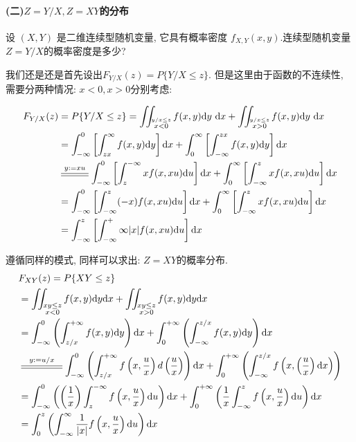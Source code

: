 \paragraph{(二)$Z=Y/X,Z=XY$的分布}

设 $(X, Y)$ 是二维连续型随机变量, 它具有概率密度 $f_{X,Y}(x, y)$.连续型随机变量$Z=Y/X$的概率密度是多少?

我们还是还是首先设出$F_{Y/X}(z)=P\{Y/X\leq z\}$. 但是这里由于函数的不连续性, 需要分两种情况: $x<0, x>0$分别考虑:

$$
\begin{aligned}
F_{Y / X}(z) & =P\{Y / X \leq z\}=\iint_{\stackrel{y / x \leq z}{x<0}} f(x, y) \mathrm{d} y \mathrm{~d} x+\iint_{\stackrel{y / x \leq z}{x>0}} f(x, y) \mathrm{d} y \mathrm{~d} x \\
& =\int_{-\infty}^0\left[\int_{z x}^{\infty} f(x, y) \mathrm{d} y\right] \mathrm{d} x+\int_0^{\infty}\left[\int_{-\infty}^{z x} f(x, y) \mathrm{d} y\right] \mathrm{d} x \\
& \varsub{y:=xu}{1cm} \int_{-\infty}^0\left[\int_z^{-\infty} x f(x, x u) \mathrm{d} u\right] \mathrm{d} x+\int_0^{\infty}\left[\int_{-\infty}^z x f(x, x u) \mathrm{d} u\right] \mathrm{d} x \\
& =\int_{-\infty}^0\left[\int_{-\infty}^z(-x) f(x, x u) \mathrm{d} u\right] \mathrm{d} x+\int_0^{\infty}\left[\int_{-\infty}^z x f(x, x u) \mathrm{d} u\right] \mathrm{d} x \\
& =\int_{-\infty}^z\left[\int_{-\infty}^+\infty|x| f(x, x u) \mathrm{d} u\right] \mathrm{d} x
\end{aligned}
$$

遵循同样的模式, 同样可以求出: $Z=XY$的概率分布. 
$$
\begin{aligned} & F_{XY}(z)=P\{XY\leq z\}\\
 & =\iint_{\substack{xy\leq z\\
 x<0}}f(x,y)\dd y\dd x+\iint_{\substack{xy\leq z\\
 x>0}}f(x,y)\dd y\dd x\\
 & =\int_{-\infty}^{0}\left(\int_{z/x}^{+\infty}f(x,y)\dd y\right)\dd x+\int_{0}^{+\infty}\left(\int_{-\infty}^{z/x}f(x,y)\dd y\right)\dd x\\
 & \varsub{y:=u/x}{1.5cm}\int_{-\infty}^{0}\left(\int_{z/x}^{+\infty}f\left(x,\frac{u}{x}\right)d\left(\frac{u}{x}\right)\right)\dd x+\int_{0}^{+\infty}\left(\int_{-\infty}^{z/x}f\left(x,\left(\frac{u}{x}\right)\dd x\right)\right)\\
 & =\int_{-\infty}^{0}\left(\left(\frac{1}{x}\right)\int_{z}^{-\infty}f\left(x,\frac{u}{x}\right)\dd u\right)\dd x+\int_{0}^{+\infty}\left(\frac{1}{x}\int_{-\infty}^{z}f\left(x,\frac{u}{x}\right)\dd u\right)\dd x\\
 & =\int_{0}^{z}\left(\int_{-\infty}^{\infty}\frac{1}{|x|}f\left(x,\frac{u}{x}\right)\dd u\right)\dd x
\end{aligned}
$$

